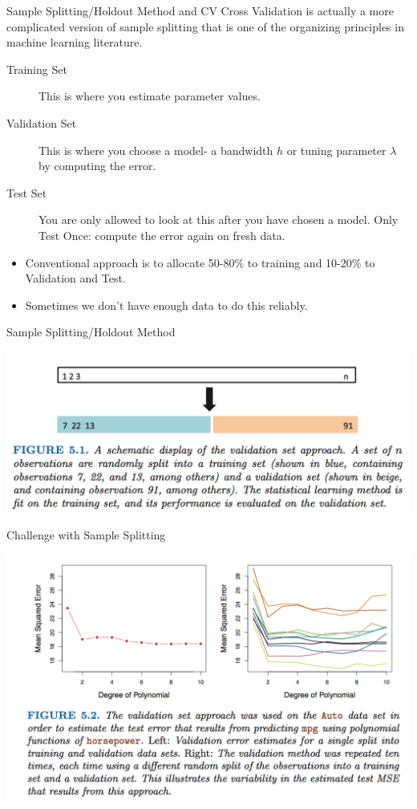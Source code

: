 \documentclass[11pt, aspectratio=169]{beamer}
\begin{document}
\begin{frame}{Sample Splitting/Holdout Method and CV}
  Cross Validation is actually a more complicated version of \alert{sample splitting} that is one of the organizing principles in machine learning literature.
  
  \begin{description}
  \item[Training Set] This is where you estimate parameter values.
  \item[Validation Set] This is where you choose a model- a bandwidth $h$ or tuning parameter $\lambda$ by computing the error.
  \item[Test Set] You are only allowed to look at this after you have chosen a model. \alert{Only Test Once}: compute the error again on fresh data.
  \end{description}
  \begin{itemize}
  \item Conventional approach is to allocate 50-80\% to training and 10-20\% to Validation and Test.
  \item Sometimes we don't have enough data to do this reliably.
  \end{itemize}
  \end{frame}
  
\begin{frame}{Sample Splitting/Holdout Method}
  \begin{center}
  \includegraphics[width=\textwidth]{./resources/split-sample}
  \end{center}
\end{frame}
  
\begin{frame}{Challenge with Sample Splitting}
  \begin{center}
  \includegraphics[width=\textwidth]{./resources/validation-10fold}
  \end{center}
\end{frame}
  
\end{document}
